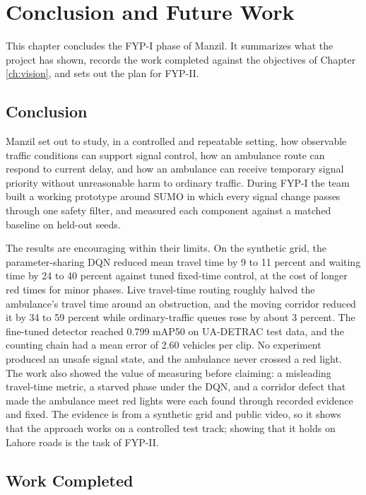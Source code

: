 \chapter{Conclusion and Future Work}
\label{ch:conclusion}

This chapter concludes the FYP-I phase of Manzil. It summarizes what the project has shown, records the work completed against the objectives of Chapter \ref{ch:vision}, and sets out the plan for FYP-II.

\section{Conclusion}

Manzil set out to study, in a controlled and repeatable setting, how observable traffic conditions can support signal control, how an ambulance route can respond to current delay, and how an ambulance can receive temporary signal priority without unreasonable harm to ordinary traffic. During FYP-I the team built a working prototype around SUMO in which every signal change passes through one safety filter, and measured each component against a matched baseline on held-out seeds.

The results are encouraging within their limits. On the synthetic grid, the parameter-sharing DQN reduced mean travel time by 9 to 11 percent and waiting time by 24 to 40 percent against tuned fixed-time control, at the cost of longer red times for minor phases. Live travel-time routing roughly halved the ambulance's travel time around an obstruction, and the moving corridor reduced it by 34 to 59 percent while ordinary-traffic queues rose by about 3 percent. The fine-tuned detector reached 0.799 mAP50 on UA-DETRAC test data, and the counting chain had a mean error of 2.60 vehicles per clip. No experiment produced an unsafe signal state, and the ambulance never crossed a red light. The work also showed the value of measuring before claiming: a misleading travel-time metric, a starved phase under the DQN, and a corridor defect that made the ambulance meet red lights were each found through recorded evidence and fixed. The evidence is from a synthetic grid and public video, so it shows that the approach works on a controlled test track; showing that it holds on Lahore roads is the task of FYP-II.

\section{Work Completed}

